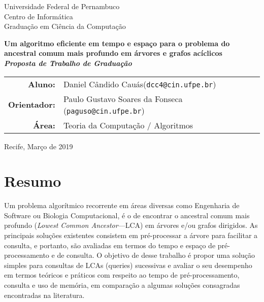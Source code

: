 \documentclass[12pt, a4paper, oneside]{article}
\begin{document}


\thispagestyle{empty}
\begin{center}
\Large
Universidade Federal de Pernambuco\\
Centro de Informática\\
Graduação em Ciência da Computação

\vfill

{\huge \bfseries Um algoritmo eficiente em tempo e espaço para o problema do ancestral comum mais profundo em árvores e grafos acíclicos }
\\
\medskip
{\bfseries\itshape Proposta de Trabalho de Graduação}

\vfill

\bigskip

	\begin{tabular}{r p{95mm}}
	\textbf{Aluno: } & Daniel Cândido Cauás\newline(\texttt{dcc4@cin.ufpe.br}) \\ 
\textbf{Orientador: } & Paulo Gustavo Soares da Fonseca \newline(\texttt{paguso@cin.ufpe.br})
\\
	\textbf{Área: } & Teoria da Computação / Algoritmos
\end{tabular}

	\vspace{3cm}
Recife, Março de 2019 
\end{center}

\clearpage 
\thispagestyle{empty}
\section*{Resumo}
Um problema algorítmico recorrente em áreas diversas como Engenharia de Software ou Biologia Computacional, é o de encontrar o ancestral comum mais profundo (\textit{Lowest Common Ancestor}---LCA) em árvores e/ou grafos dirigidos. As principais soluções existentes consistem em pré-processar a árvore para facilitar a consulta, e portanto, são avaliadas em termos do tempo e espaço de pré-processamento e de consulta. O objetivo de desse trabalho é propor uma solução simples para consultas de LCAs (queries) sucessivas e avaliar o seu desempenho em termos teóricos e práticos com respeito ao tempo de pré-processamento, consulta e uso de memória, em comparação a algumas soluções consagradas encontradas na literatura.
\end{document}
